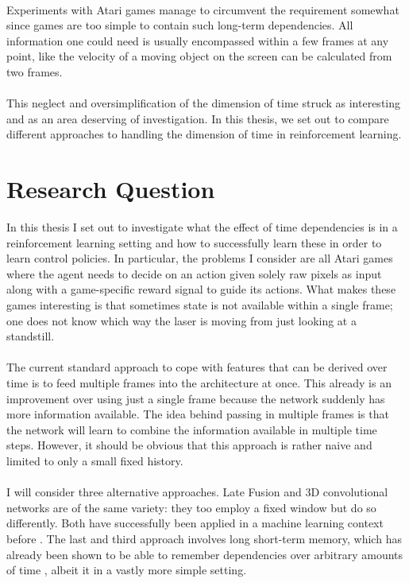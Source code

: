 \paragraph{}
Experiments with Atari games
manage to circumvent the requirement somewhat
since games are too simple
to contain such long-term dependencies.
All information one could need is usually encompassed
within a few frames at any point,
like the velocity of a moving object on the screen
can be calculated from two frames.

\paragraph{}
This neglect and oversimplification of the dimension of time
struck as interesting and as an area
deserving of investigation.
In this thesis,
we set out to compare different approaches
to handling the dimension of time in reinforcement learning.

\section{Research Question}
\label{sec:research_question}
In this thesis I set out to investigate
what the effect of time dependencies is
in a reinforcement learning setting
and how to successfully learn these
in order to learn control policies.
In particular,
the problems I consider
are all Atari games
where the agent needs to decide on an action
given solely raw pixels as input
along with a game-specific reward signal
to guide its actions.
What makes these games interesting is that sometimes
state is not available within a single frame;
one does not know which way the laser is moving
from just looking at a standstill.

\paragraph{}
The current standard approach to cope with
features that can be derived over time
is to feed multiple frames into the architecture at once.
This already is an improvement over using just a single frame
because the network suddenly has more information available.
The idea behind passing in multiple frames
is that the network will learn to combine the information
available in multiple time steps.
However,
it should be obvious that
this approach is rather naive
and limited to only a small fixed history.

\paragraph{}
I will consider three alternative approaches.
Late Fusion and 3D convolutional networks
are of the same variety:
they too employ a fixed window but
do so differently.
Both have successfully been applied in a machine learning context before
\parencite{Karpathy2014,Ji2013}.
The last and third approach involves
long short-term memory,
which has already been shown to be able to remember
dependencies over arbitrary amounts of time
\parencite{Bakker2001},
albeit it in a vastly more simple setting.

